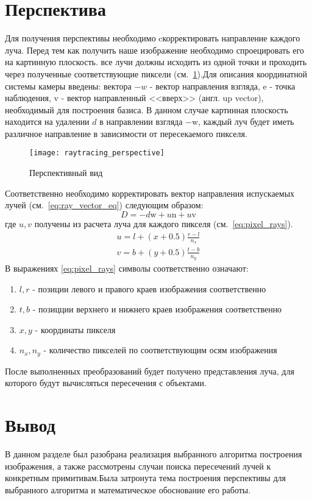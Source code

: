 \section{Перспектива}
Для получения перспективы необходимо cкорректировать направление каждого луча. Перед тем как получить наше изображение необходимо спроецировать его на картинную плоскость.
все лучи должны исходить из одной точки и проходить через полученные соответствующие пиксели (см.~\ref{fig:perspective_view}).Для описания координатной системы камеры введены:
вектора $-w$ - вектор направления взгляда, $\mathrm{e}$ - точка наблюдения, $\mathrm{v}$ - вектор направленный <<вверх>> (англ. up vector), необходимый для построения базиса.
В данном случае картинная плоскость находится на удалении $d$ в направлении взгляда $\mathrm{-w}$, каждый луч будет иметь различное направление в зависимости от пересекаемого пикселя.
\begin{figure}[H]
	\centering
	\texttt{[image: raytracing\_perspective]}
	\caption{Перспективный вид}
	\label{fig:perspective_view}
\end{figure}
Соответственно необходимо корректировать вектор направления испускаемых лучей (см.~\ref{eq:ray_vector_eq}) следующим образом:
\begin{equation}
	D = -d\mathrm{w} + u\mathrm{n} + u\mathrm{v}
\end{equation}
где $u,v$ получены из расчета луча для каждого пикселя (см.~\ref{eq:pixel_rays}).
\begin{equation}
	\begin{aligned}
		u = l + (x + 0.5)\frac{r - l}{n_x}\\
		v = b + (y + 0.5)\frac{t - b}{n_y}
	\end{aligned}
	\label{eq:pixel_rays}
\end{equation}
В выражениях \ref{eq:pixel_rays} символы соответственно означают:
\begin{enumerate}
	\item $l,r$ - позиции левого  и правого краев изображения соответственно
	\item $t,b$ - позицции верхнего и нижнего краев изображения соответственно
	\item $x,y$ - координаты пикселя
	\item $n_x,n_y$ - количество пикселей по соответствующим осям изображения
\end{enumerate}
После выполненных преобразований будет получено представления луча, для которого будут вычисляться
пересечения с объектами.\cite{perspective_raytracing}

\section{Вывод}
В данном разделе был разобрана реализация выбранного алгоритма построения изображения, а также рассмотрены случаи поиска пересечений лучей  к конкретным примитивам.Была затронута 
тема построения перспективы для выбранного алгоритма и математическое обоснование его работы.